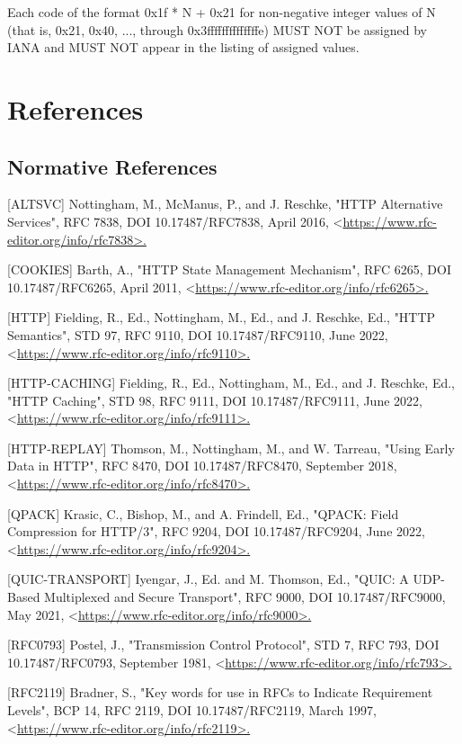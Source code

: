 \documentclass{article}
\begin{document}
Each code of the format 0x1f * N + 0x21 for non-negative integer values of N (that is, 0x21, 0x40, ..., through 0x3ffffffffffffffe) MUST NOT be assigned by IANA and MUST NOT appear in the listing of assigned values.

\section{References}

\subsection{Normative References}

[ALTSVC]   Nottingham, M., McManus, P., and J. Reschke, "HTTP Alternative Services", RFC 7838, DOI 10.17487/RFC7838, April 2016, <\url{https://www.rfc-editor.org/info/rfc7838>.}

[COOKIES]  Barth, A., "HTTP State Management Mechanism", RFC 6265, DOI 10.17487/RFC6265, April 2011, <\url{https://www.rfc-editor.org/info/rfc6265>.}

[HTTP]     Fielding, R., Ed., Nottingham, M., Ed., and J. Reschke, Ed., "HTTP Semantics", STD 97, RFC 9110, DOI 10.17487/RFC9110, June 2022, <\url{https://www.rfc-editor.org/info/rfc9110>.}

[HTTP-CACHING] Fielding, R., Ed., Nottingham, M., Ed., and J. Reschke, Ed., "HTTP Caching", STD 98, RFC 9111, DOI 10.17487/RFC9111, June 2022, <\url{https://www.rfc-editor.org/info/rfc9111>.}

[HTTP-REPLAY] Thomson, M., Nottingham, M., and W. Tarreau, "Using Early Data in HTTP", RFC 8470, DOI 10.17487/RFC8470, September 2018, <\url{https://www.rfc-editor.org/info/rfc8470>.}

[QPACK]    Krasic, C., Bishop, M., and A. Frindell, Ed., "QPACK: Field Compression for HTTP/3", RFC 9204, DOI 10.17487/RFC9204, June 2022, <\url{https://www.rfc-editor.org/info/rfc9204>.}

[QUIC-TRANSPORT] Iyengar, J., Ed. and M. Thomson, Ed., "QUIC: A UDP-Based Multiplexed and Secure Transport", RFC 9000, DOI 10.17487/RFC9000, May 2021, <\url{https://www.rfc-editor.org/info/rfc9000>.}

[RFC0793]  Postel, J., "Transmission Control Protocol", STD 7, RFC 793, DOI 10.17487/RFC0793, September 1981, <\url{https://www.rfc-editor.org/info/rfc793>.}

[RFC2119]  Bradner, S., "Key words for use in RFCs to Indicate Requirement Levels", BCP 14, RFC 2119, DOI 10.17487/RFC2119, March 1997, <\url{https://www.rfc-editor.org/info/rfc2119>.}
\end{document}
